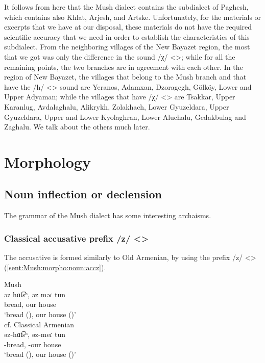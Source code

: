 It follows from here that the Mush dialect contains the subdialect of Paghesh, which contains also Khlat, Arjesh, and Artske. Unfortunately, for the materials or excerpts that we have at our disposal, these materials do not have the required scientific accuracy that we need in order to establish the characteristics of this subdialect. From the neighboring villages of the New Bayazet region, the most that we got was only the difference in the sound /χ/ <>; while for all the remaining points, the two branches are in agreement with each other. In the region of New Bayazet, the villages that belong to the Mush branch and that have the /h/ <> sound are Yeranos, Adamxan, Dzoragegh, Gölköy, Lower and Upper Adyaman; while the villages that have /χ/ <> are Tsakkar, Upper Karanlug, Avdalaghalu, Alikrykh, Zolakhach, Lower Gyuzeldara, Upper Gyuzeldara, Upper and Lower Kyolaghran, Lower Aluchalu, Gedakbulag and Zaghalu. We talk about the others much later. 

\section{Morphology}
\subsection{Noun inflection or declension}
The grammar of the Mush dialect has some interesting archaisms.


\subsubsection{Classical accusative prefix /z/ <>}\label{section:mush:morpho:noun:z}
The accusative is formed similarly to Old Armenian, by using the prefix /z/ <> (\ref{sent:Mush:morpho:noun:accz}). 

\begin{exe}
	\ex \label{sent:Mush:morpho:noun:accz} \begin{xlist}
		\ex Mush \\
		\gll əz hɑt͡sʰ, əz məɾ tun \\ 
		{\acc} bread, {\acc} our house \\
		\trans `bread ({\acc}), our house ({\acc})'\\
		\newpage
		\ex cf. Classical Armenian \\
		\gll əz-hɑt͡sʰ, əz-meɾ tun \\ 
		{\acc}-bread, {\acc}-our house \\
		\trans `bread ({\acc}), our house ({\acc})' \\
	\end{xlist}
	
\end{exe}
